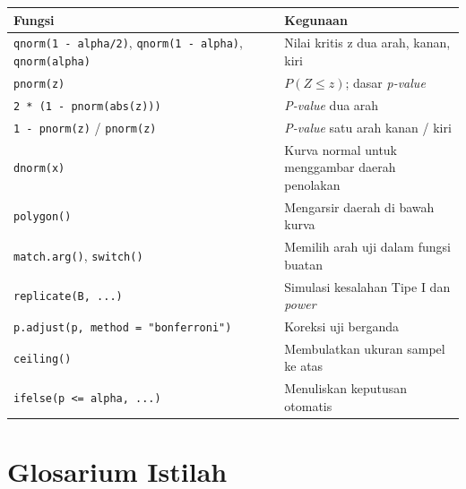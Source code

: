 \documentclass[
  indonesian,
  letterpaper,
]{book}
\newcounter{none} %
\begin{document}
{\def\LTcaptype{none} %
\begin{longtable}[]{@{}
  >{\raggedright\arraybackslash}p{}
  >{\raggedright\arraybackslash}p{}@{}}
\toprule\noalign{}
\begin{minipage}[b]{\linewidth}\raggedright
Fungsi
\end{minipage} & \begin{minipage}[b]{\linewidth}\raggedright
Kegunaan
\end{minipage} \\
\midrule\noalign{}
\endhead
\bottomrule\noalign{}
\endlastfoot
\texttt{qnorm(1\ -\ alpha/2)}, \texttt{qnorm(1\ -\ alpha)},
\texttt{qnorm(alpha)} & Nilai kritis z dua arah, kanan, kiri \\
\texttt{pnorm(z)} & \(P(Z \le z)\); dasar \emph{p-value} \\
\texttt{2\ *\ (1\ -\ pnorm(abs(z)))} & \emph{P-value} dua arah \\
\texttt{1\ -\ pnorm(z)} / \texttt{pnorm(z)} & \emph{P-value} satu arah
kanan / kiri \\
\texttt{dnorm(x)} & Kurva normal untuk menggambar daerah penolakan \\
\texttt{polygon()} & Mengarsir daerah di bawah kurva \\
\texttt{match.arg()}, \texttt{switch()} & Memilih arah uji dalam fungsi
buatan \\
\texttt{replicate(B,\ ...)} & Simulasi kesalahan Tipe I dan
\emph{power} \\
\texttt{p.adjust(p,\ method\ =\ "bonferroni")} & Koreksi uji berganda \\
\texttt{ceiling()} & Membulatkan ukuran sampel ke atas \\
\texttt{ifelse(p\ \textless{}=\ alpha,\ ...)} & Menuliskan keputusan
otomatis \\
\end{longtable}
}


\chapter{Glosarium Istilah}\label{glosarium-istilah-1}
\end{document}
